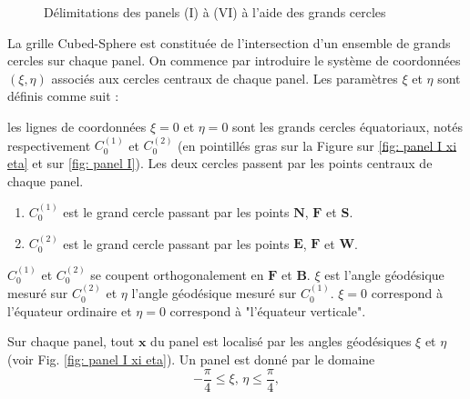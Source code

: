 \begin{figure}[htbp]
\begin{center}
\end{center}
\caption{Délimitations des panels (I) à (VI) à l'aide des grands cercles}
\label{fig: panel I to VI}
\end{figure}

La grille Cubed-Sphere est constituée de l'intersection d'un ensemble de grands cercles sur chaque panel. On commence par introduire le système de coordonnées $(\xi,\eta)$ associés aux cercles centraux de chaque panel. Les paramètres $\xi$ et  $\eta$ sont définis comme suit :

\begin{definition}

les lignes de coordonnées $\xi = 0$ et $\eta = 0$ sont les grands cercles équatoriaux, notés respectivement $C_0^{(1)}$ et $C_0^{(2)}$ (en pointillés gras sur la Figure sur \ref{fig: panel I xi eta} et sur \ref{fig: panel I}).  Les deux cercles passent par les points centraux de chaque panel. 

\begin{enumerate}
\item $C_0^{(1)}$ est le grand cercle passant par les points $\mathbf{N}$, $\mathbf{F}$ et $\mathbf{S}$.

\item $C_0^{(2)}$ est le grand cercle passant par les points $\mathbf{E}$, $\mathbf{F}$ et $\mathbf{W}$.
\end{enumerate} 
$C_0^{(1)}$ et $C_0^{(2)}$ se coupent orthogonalement en $\mathbf{F}$ et $\mathbf{B}$.
$\xi$ est l'angle géodésique mesuré sur $C_0^{(2)}$ et $\eta$ l'angle géodésique mesuré sur $C_0^{(1)}$. $\xi = 0$ correspond à l'équateur ordinaire et $\eta=0$ correspond à "l'équateur verticale".
\end{definition}

Sur chaque panel, tout $\mathbf{x}$ du panel est localisé par les angles géodésiques $\xi$ et $\eta$  (voir Fig. \ref{fig: panel I xi eta}).
Un panel est donné par le domaine
\begin{equation}
- \dfrac{\pi}{4} \leq \xi\text{, }\eta \leq \dfrac{\pi}{4},
\end{equation}

